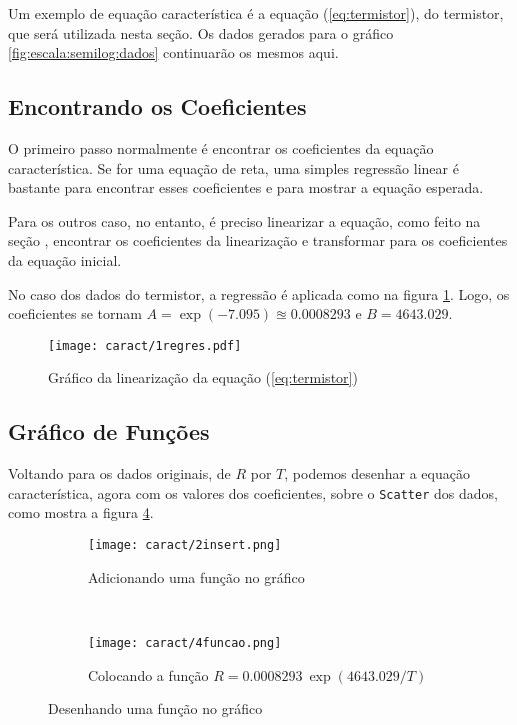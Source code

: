 Um exemplo de equação característica é a equação (\ref{eq:termistor}), do termistor, que será utilizada nesta seção. Os dados gerados para o gráfico \ref{fig:escala:semilog:dados} continuarão os mesmos aqui.

\subsection{Encontrando os Coeficientes}

    O primeiro passo normalmente é encontrar os coeficientes da equação característica. Se for uma equação de reta, uma simples regressão linear é bastante para encontrar esses coeficientes e para mostrar a equação esperada.

    Para os outros caso, no entanto, é preciso linearizar a equação, como feito na seção , encontrar os coeficientes da linearização e transformar para os coeficientes da equação inicial.

    No caso dos dados do termistor, a regressão é aplicada como na figura \ref{fig:caract:regres}. Logo, os coeficientes se tornam $A = \exp(-7.095) \approxeq 0.0008293$ e $B = 4643.029$.

    \begin{figure}[htbp]
        \centering
        \texttt{[image: caract/1regres.pdf]}

        \caption{Gráfico da linearização da equação (\ref{eq:termistor})}
        \label{fig:caract:regres}
    \end{figure}


\subsection{Gráfico de Funções}

    Voltando para os dados originais, de $R$ por $T$, podemos desenhar a equação característica, agora com os valores dos coeficientes, sobre o \texttt{Scatter} dos dados, como mostra a figura \ref{fig:caract:inserir}.

    \begin{figure}[htbp]
        \centering
        \begin{subfigure}{0.4\textwidth}
            \centering
            \texttt{[image: caract/2insert.png]}

            \caption{Adicionando uma função no gráfico}
            \label{fig:caract:novo}
        \end{subfigure}
        ~
        \begin{subfigure}{0.55\textwidth}
            \centering
            \texttt{[image: caract/4funcao.png]}

            \caption{Colocando a função $R = 0.0008293 ~ \exp(4643.029/T)$}
            \label{fig:caract:funcao}
        \end{subfigure}
        \caption{Desenhando uma função no gráfico}
        \label{fig:caract:inserir}
    \end{figure}


